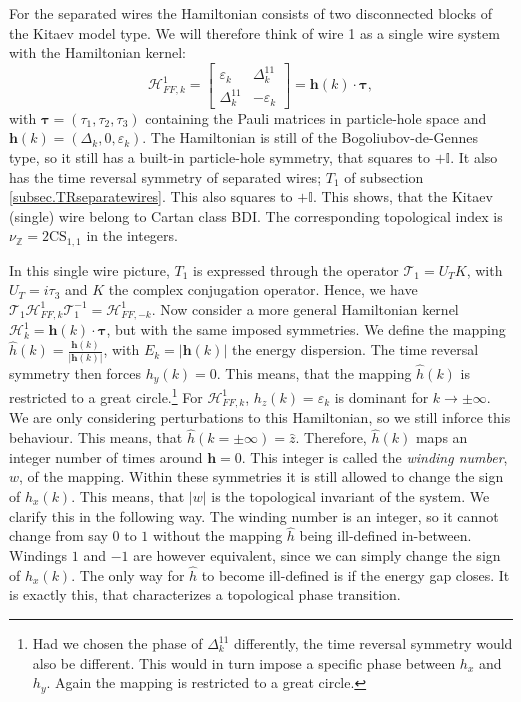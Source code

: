 For the separated wires the Hamiltonian consists of two disconnected blocks of the Kitaev model type. We will therefore think of wire 1 as a single wire system with the Hamiltonian kernel:
\begin{equation}
\mathcal{H}^{1}_{FF,k} = \begin{bmatrix} \varepsilon_k & \Delta^{11}_k \\ \Delta^{11}_k & -\varepsilon_k \end{bmatrix} = \mathbf{h}(k)\cdot\boldsymbol\tau,
\label{eq.singlewire.Hamiltoniankernel}
\end{equation}
with $\boldsymbol\tau = (\tau_1, \tau_2, \tau_3)$ containing the Pauli matrices in particle-hole space and $\mathbf{h}(k) = (\Delta_k, 0, \varepsilon_k)$. The Hamiltonian is still of the Bogoliubov-de-Gennes type, so it still has a built-in particle-hole symmetry, that squares to $+\mathbb{I}$. It also has the time reversal symmetry of separated wires; $T_1$ of subsection \ref{subsec.TRseparatewires}. This also squares to $+\mathbb{I}$.  This shows, that the Kitaev (single) wire belong to Cartan class BDI. The corresponding topological index is $\nu_{\mathbb{Z}} = 2\text{CS}_{1,1}$ in the integers. 

In this single wire picture, $T_1$ is expressed through the operator $\mathcal{T}_1 = U_TK$, with $U_T = i\tau_3$ and $K$ the complex conjugation operator. Hence, we have $\mathcal{T}_1\mathcal{H}^{1}_{FF,k}\mathcal{T}^{-1}_1 = \mathcal{H}^{1}_{FF,-k}$. Now consider a more general Hamiltonian kernel $\mathcal{H}^{1}_k = \mathbf{h}(k)\cdot\boldsymbol\tau$, but with the same imposed symmetries. We define the mapping $\hat{h}(k) = \frac{\mathbf{h}(k)}{|\mathbf{h}(k)|}$, with $E_k = |\mathbf{h}(k)|$ the energy dispersion. The time reversal symmetry then forces $h_y(k) = 0$. This means, that the mapping $\hat{h}(k)$ is restricted to a great circle.\footnote{Had we chosen the phase of $\Delta^{11}_k$ differently, the time reversal symmetry would also be different. This would in turn impose a specific phase between $h_x$ and $h_y$. Again the mapping is restricted to a great circle.} For $\mathcal{H}^{1}_{FF,k}$, $h_z(k) = \varepsilon_k$ is dominant for $k\to \pm \infty$. We are only considering perturbations to this Hamiltonian, so we still inforce this behaviour. This means, that $\hat{h}(k = \pm \infty) = \hat{z}$. Therefore, $\hat{h}(k)$ maps an integer number of times around $\mathbf{h} = 0$. This integer is called the \textit{winding number}, $w$, of the mapping. Within these symmetries it is still allowed to change the sign of $h_x(k)$. This means, that $|w|$ is the topological invariant of the system. We clarify this in the following way. The winding number is an integer, so it cannot change from say $0$ to $1$ without the mapping $\hat{h}$ being ill-defined in-between. Windings $1$ and $-1$ are however equivalent, since we can simply change the sign of $h_x(k)$. The only way for $\hat{h}$ to become ill-defined is if the energy gap closes. It is exactly this, that characterizes a topological phase transition. 

